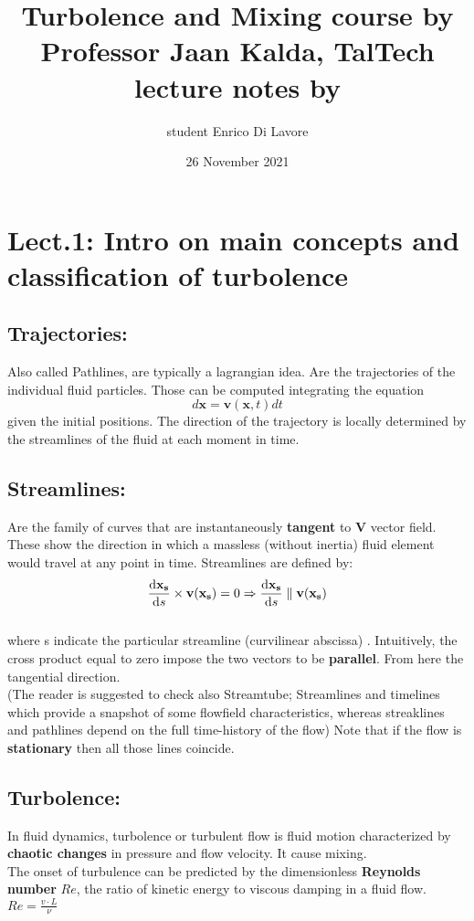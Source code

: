 \documentclass[a4paper,11pt]{article}
\begin{document}
\title{%
Turbolence and Mixing course by\\
Professor Jaan Kalda, TalTech\\
lecture notes by}
\author{student Enrico Di Lavore}
\date{26 November 2021}
\maketitle

	\section{Lect.1: Intro on main concepts and classification of turbolence}
	
\subsection {Trajectories:}
Also called Pathlines, are typically a lagrangian idea. Are the trajectories of the individual fluid particles. 
Those can be computed integrating the equation
\[ d\mathbf{x}=\mathbf{v}(\mathbf{x},t) dt   \]
given the initial positions.
The direction of the trajectory is locally determined by the streamlines of the fluid at each moment in time.

\subsection{Streamlines:}
Are the family of curves that are instantaneously \textbf{tangent} to $\mathbf{V}$ vector field. These show the direction in which a massless (without inertia) fluid element would travel at any point in time.
Streamlines are defined by:
\[ \dv{\mathbf{x_s}}{s}  \times \mathbf{v}(\mathbf{x_s})=0  \Rightarrow \dv{\mathbf{x_s}}{s}\parallel  \mathbf{v}(\mathbf{x_s})   \] \\
where s indicate the particular streamline (curvilinear abscissa) . Intuitively, the cross product equal to zero impose the two vectors to be \textbf{parallel}. From here the tangential direction.\\
(The reader is suggested to check also Streamtube; Streamlines and timelines which provide a snapshot of some flowfield characteristics, whereas streaklines and pathlines depend on the full time-history of the flow)
Note that if the flow is \textbf{stationary} then all those lines coincide. %

\subsection {Turbolence:} 
In fluid dynamics, turbolence or turbulent flow is fluid motion characterized by \textbf{chaotic changes} in pressure and flow velocity. It cause mixing.\\
The onset of turbulence can be predicted by the dimensionless \textbf{Reynolds number} $Re$, the ratio of kinetic energy to viscous damping in a fluid flow. $Re=\frac{v \cdot L}{\nu}$
\end{document}
